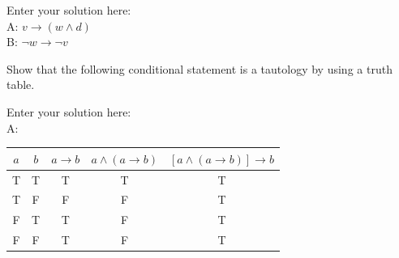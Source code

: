 \documentclass[10pt]{exam}
\begin{document}
\begin{questions}

\begin{solution}
    Enter your solution here:
    \\A: $ v \rightarrow ( w \land d) $
    \vspace{.1cm}
    \\B: $ \lnot w \rightarrow \lnot v $
\end{solution}

\question[16] Show that the following conditional statement is a tautology by using a truth table.

\begin{solution}
    Enter your solution here: \\
    A: 
    \begin{center}
    \begin{tabular}{|c|c|c|c|c|}
    \hline
    $a$ & $b$ & $a \to b$ & $a \wedge (a \to b)$ & $[a \wedge (a \to b)] \to b$ \\ \hline
    T & T & T & T & T \\ \hline
    T & F & F & F & T \\ \hline
    F & T & T & F & T \\ \hline
    F & F & T & F & T \\ \hline
    \end{tabular}
    \end{center}
    

\end{solution}
\end{questions}
\end{document}
